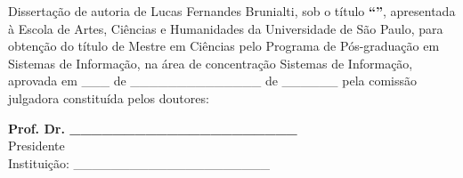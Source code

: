 \documentclass[
    12pt,                %
    oneside,            %
    a4paper,            %
    english,            %
    brazil                %
    ]{abntex2ppgsi}
\begin{document}

\begin{folhadeaprovacao}
%
%
%
%
\noindent Dissertação de autoria de Lucas Fernandes Brunialti, sob o título \textbf{``\imprimirtitulo''}, apresentada à Escola de Artes, Ciências e Humanidades da Universidade de São Paulo, para obtenção do título de Mestre em Ciências pelo Programa de Pós-graduação em Sistemas de Informação, na área de concentração Sistemas de Informação, aprovada em \_\_\_ de \_\_\_\_\_\_\_\_\_\_\_\_\_\_ de \_\_\_\_\_\_ pela comissão julgadora constituída pelos doutores:

\vspace*{3cm}

\begin{center}
%
%
%
%
%
%
%
%
%
\textbf{Prof. Dr. \_\_\_\_\_\_\_\_\_\_\_\_\_\_\_\_\_\_\_\_\_}
\\ Presidente
\\ Instituição: \_\_\_\_\_\_\_\_\_\_\_\_\_\_\_\_\_\_\_\_\_


\end{center}
\end{folhadeaprovacao}
\end{document}
